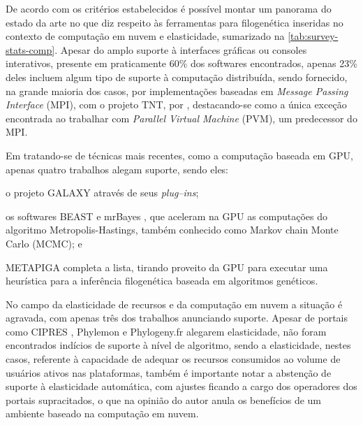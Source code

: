 \documentclass[english,brazilian]{UNISINOSmonografia} %
\begin{document}
De acordo com os critérios estabelecidos é possível montar um panorama do estado da arte no que diz respeito às ferramentas para filogenética inseridas no contexto de computação em nuvem e elasticidade, sumarizado na \autoref{tab:survey-stats-comp}.
Apesar do amplo suporte à interfaces gráficas ou consoles interativos, presente em praticamente 60\% dos softwares encontrados, apenas 23\% deles incluem algum tipo de suporte à computação distribuída, sendo fornecido, na grande maioria dos casos, por implementações baseadas em \textit{Message Passing Interface} (MPI), com o projeto TNT, por , destacando-se como a única exceção encontrada ao trabalhar com \textit{Parallel Virtual Machine} (PVM), um predecessor do MPI.


Em tratando-se de técnicas mais recentes, como a computação baseada em GPU, apenas quatro trabalhos alegam suporte, sendo eles:
\begin{inparaenum}
	\item o projeto GALAXY \cite{Afgan2016} através de seus \textit{plug--ins};
	\item os softwares BEAST \cite{Drummond2002} e mrBayes \cite{Huelsenbeck2001}, que aceleram na GPU as computações do algoritmo Metropolis-Hastings, também conhecido como Markov chain Monte Carlo (MCMC); e
	\item METAPIGA \cite{Helaers2010} completa a lista, tirando proveito da GPU para executar uma heurística para a inferência filogenética baseada em algoritmos genéticos.
\end{inparaenum}


No campo da elasticidade de recursos e da computação em nuvem a situação é agravada, com apenas três dos trabalhos anunciando suporte.
Apesar de portais como CIPRES \cite{Miller2010}, Phylemon \cite{Tarraga2007,Sanchez2011} e Phylogeny.fr \cite{Dereeper2008} alegarem elasticidade, não foram encontrados indícios de suporte à nível de algoritmo, sendo a elasticidade, nestes casos, referente à capacidade de adequar os recursos consumidos ao volume de usuários ativos nas plataformas, também é importante notar a abstenção de suporte à elasticidade automática, com ajustes ficando a cargo dos operadores dos portais supracitados, o que na opinião do autor anula os benefícios de um ambiente baseado na computação em nuvem.
\end{document}
